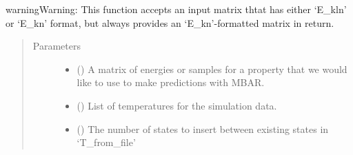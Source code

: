\documentclass[letterpaper,12pt,english,openany,oneside]{sphinxmanual}
\begin{document}
\begin{fulllineitems}
\begin{sphinxadmonition}{warning}{Warning:}
This function accepts an input matrix thtat has either ‘E\_kln’ or ‘E\_kn’ format, but always provides an ‘E\_kn’-formatted matrix in return.
\end{sphinxadmonition}
\begin{quote}\begin{description}
\item[{Parameters}] \leavevmode\begin{itemize}
\item {} 
 (\sphinxstyleliteralemphasis{\sphinxupquote{( }}\sphinxstyleliteralemphasis{\sphinxupquote{( }}\sphinxstyleliteralemphasis{\sphinxupquote{ ) }}\sphinxstyleliteralemphasis{\sphinxupquote{ ) }}\sphinxstyleliteralemphasis{\sphinxupquote{( }}\sphinxstyleliteralemphasis{\sphinxupquote{( }}\sphinxstyleliteralemphasis{\sphinxupquote{( }}\sphinxstyleliteralemphasis{\sphinxupquote{ ) }}\sphinxstyleliteralemphasis{\sphinxupquote{ ) }}\sphinxstyleliteralemphasis{\sphinxupquote{ )}}) \textendash{} A matrix of energies or samples for a property that we would like to use to make predictions with MBAR.

\item {} 
 (\sphinxstyleliteralemphasis{\sphinxupquote{( }}\sphinxstyleliteralemphasis{\sphinxupquote{ )}}) \textendash{} List of temperatures for the simulation data.

\item {} 
 () \textendash{} The number of states to insert between existing states in ‘T\_from\_file’


\end{itemize}
\end{description}
\end{quote}
\end{fulllineitems}
\end{document}
